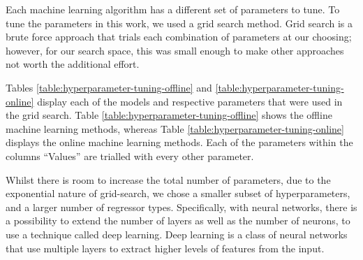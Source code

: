 Each machine learning algorithm has a different set of parameters to tune. To tune the parameters in this work, we used a grid search method. Grid search is a brute force approach that trials each combination of parameters at our choosing; however, for our search space, this was small enough to make other approaches not worth the additional effort.

Tables \ref{table:hyperparameter-tuning-offline} and \ref{table:hyperparameter-tuning-online} display each of the models and respective parameters that were used in the grid search. Table \ref{table:hyperparameter-tuning-offline} shows the offline machine learning methods, whereas Table \ref{table:hyperparameter-tuning-online} displays the online machine learning methods. Each of the parameters within the columns ``Values'' are trialled with every other parameter.

Whilst there is room to increase the total number of parameters, due to the exponential nature of grid-search, we chose a smaller subset of hyperparameters, and a larger number of regressor types. Specifically, with neural networks, there is a possibility to extend the number of layers as well as the number of neurons, to use a technique called deep learning. Deep learning is a class of neural networks that use multiple layers to extract higher levels of features from the input. %




